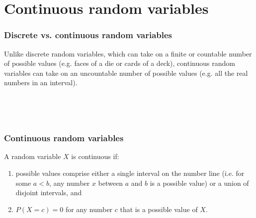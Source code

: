 \documentclass[9pt]{beamer}
\begin{document}
\section{Continuous random variables}
\begin{frame}
\frametitle{Discrete vs. continuous random variables}

Unlike discrete random variables, which can take on a finite or countable number of possible values (e.g. faces of a die or cards of a deck), continuous random variables can take on an uncountable number of possible values (e.g. all the real numbers in an interval).

\


\



\end{frame}

\begin{frame}
\frametitle{Continuous random variables}

\begin{definition} 
A random variable $X$ is continuous if:
\begin{enumerate}[label=\arabic*.]
\item possible values comprise either a single interval on the number line (i.e. for some $a < b$, any number $x$ between $a$ and $b$ is a possible value) or a union of disjoint intervals, and
\item  $P(X = c) = 0$ for any number $c$ that is a possible value of $X$.
\end{enumerate}
\end{definition}

\end{frame}
\end{document}
